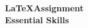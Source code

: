 \frenchspacing


\begin{center}
  { \huge \bfseries \LaTeX Assignment \\[3cm] Essential Skills \\ } 
\end{center}

\pagebreak

